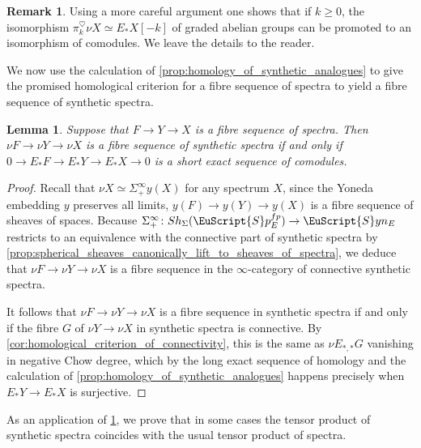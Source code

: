 \documentclass[oneside,a4paper]{amsart}
\newcommand{\euscr}[1]{\EuScript{#1}} %
\newcommand{\spectra}{\euscr{S}p} %
\newcommand{\synspectra}{\euscr{S}yn} %
\newcommand{\sigmainfty}{\Sigma^{\infty}_{+}} %
\theoremstyle{plain}
\newtheorem{lemma}[thm]{Lemma}
\theoremstyle{definition}
\newtheorem{rem}[thm]{Remark}
\theoremstyle{remark}
\begin{document}
\begin{rem}
Using a more careful argument one shows that if $k \geq 0$, the isomorphism $\pi_{k}^{\heartsuit} \nu X \simeq E_{*}X[-k]$ of graded abelian groups can be promoted to an isomorphism of comodules. We leave the details to the reader. 
\end{rem}

We now use the calculation of \cref{prop:homology_of_synthetic_analogues} to give the promised homological criterion for a fibre sequence of spectra to yield a fibre sequence of synthetic spectra. 

\begin{lemma}
\label{lemma:fibre_sequences_that_are_short_exaft_sequences_on_homology_preserved_by_synthetic_analogue_construction}
Suppose that $F \rightarrow Y \rightarrow X$ is a fibre sequence of spectra. Then $\nu F \rightarrow \nu Y \rightarrow \nu X$ is a fibre sequence of synthetic spectra if and only if $0 \rightarrow E_{*}F \rightarrow E_{*}Y \rightarrow E_{*}X \rightarrow 0$ is a short exact sequence of comodules. 
\end{lemma}

\begin{proof}
Recall that $\nu X \simeq \sigmainfty y(X)$ for any spectrum $X$, since the Yoneda embedding $y$ preserves all limits, $y(F) \rightarrow y(Y) \rightarrow y(X)$ is a fibre sequence of sheaves of spaces. Because $\sigmainfty \colon Sh_{\Sigma}(\spectra_{E}^{fp}) \rightarrow \synspectra_{E}$ restricts to an equivalence with the connective part of synthetic spectra by \cref{prop:spherical_sheaves_canonically_lift_to_sheaves_of_spectra}, we deduce that $\nu F \rightarrow \nu Y \rightarrow \nu X$ is a fibre sequence in the $\infty$-category of connective synthetic spectra. 

It follows that $\nu F \rightarrow \nu Y \rightarrow \nu X$ is a fibre sequence in synthetic spectra if and only if the fibre $G$ of $\nu Y \rightarrow \nu X$ in synthetic spectra is connective. By \cref{cor:homological_criterion_of_connectivity}, this is the same as $\nu E_{*, *} G$ vanishing in negative Chow degree, which by the long exact sequence of homology and the calculation of \cref{prop:homology_of_synthetic_analogues} happens precisely when $E_{*}Y \rightarrow E_{*}X$ is surjective.
\end{proof}

As an application of \cref{lemma:fibre_sequences_that_are_short_exaft_sequences_on_homology_preserved_by_synthetic_analogue_construction}, we prove that in some cases the tensor product of synthetic spectra coincides with the usual tensor product of spectra. 
\end{document}
